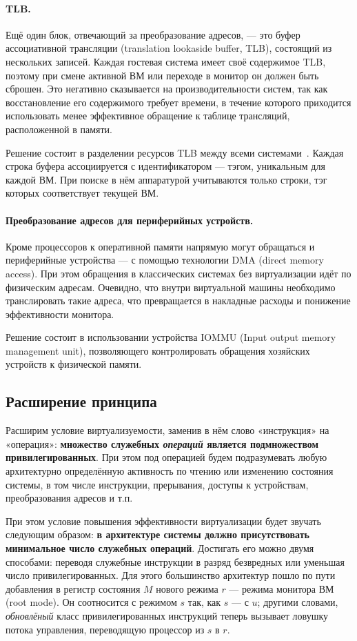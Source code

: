 \paragraph{TLB.} Ещё один блок, отвечающий за преобразование адресов, — это буфер ассоциативной трансляции (\abbr translation lookaside buffer, TLB), состоящий из нескольких записей. Каждая гостевая система имеет своё содержимое TLB, поэтому при смене активной ВМ или переходе в монитор он должен быть сброшен. Это негативно сказывается на производительности систем, так как восстановление его содержимого требует времени, в течение которого приходится использовать менее эффективное обращение к таблице трансляций, расположенной в памяти.

Решение состоит в разделении ресурсов TLB между всеми системами~\cite{YANG:2008}. Каждая строка буфера ассоциируется с идентификатором — тэгом, уникальным для каждой ВМ. При поиске в нём аппаратурой учитываются только строки, тэг которых соответствует текущей ВМ.

\paragraph{Преобразование адресов для периферийных устройств.} Кроме процессоров к оперативной памяти напрямую могут обращаться и периферийные устройства —  с помощью технологии DMA (\abbr direct memory access). При этом обращения в классических системах без виртуализации идёт по физическим адресам. Очевидно, что внутри виртуальной машины необходимо транслировать такие адреса, что превращается в накладные расходы и понижение эффективности монитора. 

Решение состоит в использовании устройства IOMMU (\abbr Input output memory management unit), позволяющего контролировать обращения хозяйских устройств к физической памяти. 

\subsection{Расширение принципа}

Расширим условие виртуализуемости, заменив в нём слово «инструкция» на «операция»: \textbf{множество служебных \emph{операций} является подмножеством привилегированных}. При этом под операцией будем подразумевать любую архитектурно определённую активность по чтению или изменению состояния системы, в том числе инструкции, прерывания, доступы к устройствам, преобразования адресов и т.п.

При этом условие повышения эффективности виртуализации будет звучать следующим образом: \textbf{в архитектуре системы должно присутствовать минимальное число служебных операций}. Достигать его можно двумя способами: переводя служебные инструкции в разряд безвредных или уменьшая число привилегированных. Для этого большинство архитектур пошло по пути добавления в регистр состояния $M$ нового режима $r$ — режима монитора ВМ (\abbr root mode). Он соотносится с режимом $s$ так, как $s$ — с $u$; другими словами, \emph{обновлёный} класс привилегированных инструкций теперь вызывает ловушку потока управления, переводящую процессор из $s$ в $r$.

